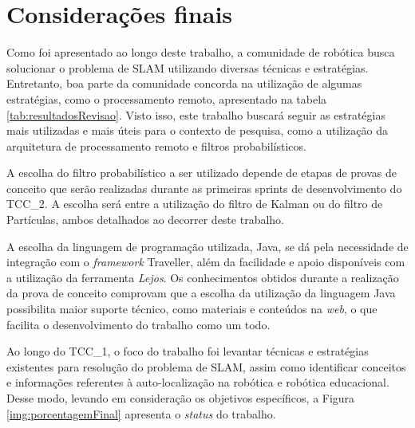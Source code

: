 \chapter[Considerações finais]{Considerações finais}

Como foi apresentado ao longo deste trabalho, a comunidade de robótica busca solucionar o problema de SLAM utilizando diversas técnicas e estratégias. Entretanto, boa parte da comunidade concorda na utilização de algumas estratégias, como o processamento remoto, apresentado na tabela \ref{tab:resultadosRevisao}. Visto isso, este trabalho buscará seguir as estratégias mais utilizadas e mais úteis para o contexto de pesquisa, como a utilização da arquitetura de processamento remoto e filtros probabilísticos.

A escolha do filtro probabilístico a ser utilizado depende de etapas de provas de conceito que serão realizadas durante as primeiras sprints de desenvolvimento do TCC\_2. A escolha será entre a utilização do filtro de Kalman ou do filtro de Partículas, ambos detalhados ao decorrer deste trabalho.

A escolha da linguagem de programação utilizada, Java, se dá pela necessidade de integração com o \textit{framework} Traveller, além da facilidade e apoio disponíveis com a utilização da ferramenta \textit{Lejos}. Os conhecimentos obtidos durante a realização da prova de conceito comprovam que a escolha da utilização da linguagem Java possibilita maior suporte técnico, como materiais e conteúdos na \textit{web}, o que facilita o desenvolvimento do trabalho como um todo.

Ao longo do TCC\_1, o foco do trabalho foi levantar técnicas e estratégias existentes para resolução do problema de SLAM, assim como identificar conceitos e informações referentes à auto-localização na robótica e robótica educacional. Desse modo, levando em consideração os objetivos específicos, a Figura \ref{img:porcentagemFinal} apresenta o \textit{status} do trabalho.

